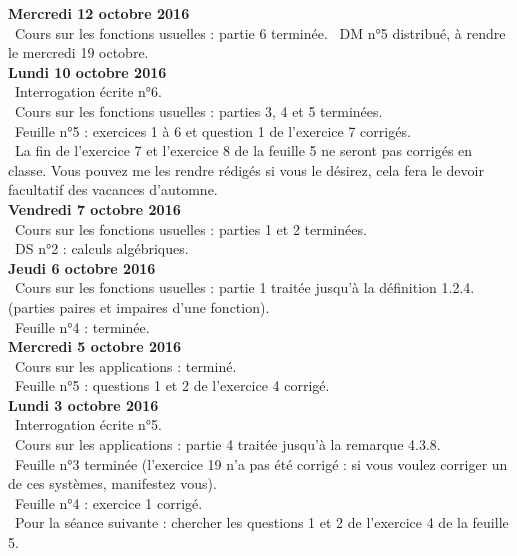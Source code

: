 \documentclass[12pt,a4paper]{article}
\begin{document}
\noindent\textbf{Mercredi 12 octobre 2016}\\
\bu\ Cours sur les fonctions usuelles : partie 6 terminée.\vspace{.4cm}
\bu\ DM n°5 distribué, à rendre le mercredi 19 octobre.\\

\noindent\textbf{Lundi 10 octobre 2016}\\
\bu\ Interrogation écrite n°6.\\
\bu\ Cours sur les fonctions usuelles : parties 3, 4 et 5 terminées.  \\
\bu\ Feuille n°5 : exercices 1 à 6 et question 1 de l'exercice 7 corrigés. \\
\bu\ La fin de l'exercice 7 et l'exercice 8 de la feuille 5 ne seront pas corrigés en classe. Vous pouvez me les rendre rédigés si vous le désirez, cela fera le devoir facultatif des vacances d'automne.\vspace{.4cm}\\

\noindent\textbf{Vendredi 7 octobre 2016}\\
\bu\ Cours sur les fonctions usuelles : parties 1 et 2 terminées.  \\
\bu\ DS n°2 : calculs algébriques.\vspace{.4cm}\\

\noindent\textbf{Jeudi 6 octobre 2016}\\
\bu\ Cours sur les fonctions usuelles : partie 1 traitée jusqu'à la définition 1.2.4. (parties paires et impaires d'une fonction).  \\
\bu\ Feuille n°4 : terminée. \vspace{.4cm}\\

\noindent\textbf{Mercredi 5 octobre 2016}\\
\bu\ Cours sur les applications : terminé. \\
\bu\ Feuille n°5 : questions 1 et 2 de l'exercice 4 corrigé. \vspace{.4cm}\\

\noindent\textbf{Lundi 3 octobre 2016}\\
\bu\ Interrogation écrite n°5. \\
\bu\ Cours sur les applications : partie 4 traitée jusqu'à la remarque 4.3.8. \\
\bu\ Feuille n°3 terminée (l'exercice 19 n'a pas été corrigé : si vous voulez corriger un de ces systèmes, manifestez vous). \\
\bu\ Feuille n°4 : exercice 1 corrigé. \\
\bu\ Pour la séance suivante : chercher les questions 1 et 2 de l'exercice 4 de la feuille 5. \vspace{.4cm}\\
\end{document}

